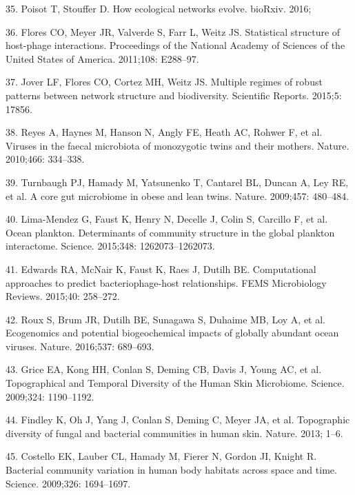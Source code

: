 \documentclass[12pt,]{article}
\begin{document}
\hypertarget{ref-Poisot071993}{}
35. Poisot T, Stouffer D. How ecological networks evolve. bioRxiv. 2016;

\hypertarget{ref-Flores:2011bh}{}
36. Flores CO, Meyer JR, Valverde S, Farr L, Weitz JS. Statistical
structure of host-phage interactions. Proceedings of the National
Academy of Sciences of the United States of America. 2011;108: E288--97.

\hypertarget{ref-Jover:2015ev}{}
37. Jover LF, Flores CO, Cortez MH, Weitz JS. Multiple regimes of robust
patterns between network structure and biodiversity. Scientific Reports.
2015;5: 17856.

\hypertarget{ref-Reyes:2010cwa}{}
38. Reyes A, Haynes M, Hanson N, Angly FE, Heath AC, Rohwer F, et al.
Viruses in the faecal microbiota of monozygotic twins and their mothers.
Nature. 2010;466: 334--338.

\hypertarget{ref-Turnbaugh:2009ei}{}
39. Turnbaugh PJ, Hamady M, Yatsunenko T, Cantarel BL, Duncan A, Ley RE,
et al. A core gut microbiome in obese and lean twins. Nature. 2009;457:
480--484.

\hypertarget{ref-LimaMendez:2015hw}{}
40. Lima-Mendez G, Faust K, Henry N, Decelle J, Colin S, Carcillo F, et
al. Ocean plankton. Determinants of community structure in the global
plankton interactome. Science. 2015;348: 1262073--1262073.

\hypertarget{ref-Edwards:2015iz}{}
41. Edwards RA, McNair K, Faust K, Raes J, Dutilh BE. Computational
approaches to predict bacteriophage-host relationships. FEMS
Microbiology Reviews. 2015;40: 258--272.

\hypertarget{ref-Roux:2016cc}{}
42. Roux S, Brum JR, Dutilh BE, Sunagawa S, Duhaime MB, Loy A, et al.
Ecogenomics and potential biogeochemical impacts of globally abundant
ocean viruses. Nature. 2016;537: 689--693.

\hypertarget{ref-Grice:2009eea}{}
43. Grice EA, Kong HH, Conlan S, Deming CB, Davis J, Young AC, et al.
Topographical and Temporal Diversity of the Human Skin Microbiome.
Science. 2009;324: 1190--1192.

\hypertarget{ref-Findley:2013jf}{}
44. Findley K, Oh J, Yang J, Conlan S, Deming C, Meyer JA, et al.
Topographic diversity of fungal and bacterial communities in human skin.
Nature. 2013; 1--6.

\hypertarget{ref-Costello:2009im}{}
45. Costello EK, Lauber CL, Hamady M, Fierer N, Gordon JI, Knight R.
Bacterial community variation in human body habitats across space and
time. Science. 2009;326: 1694--1697.
\end{document}
